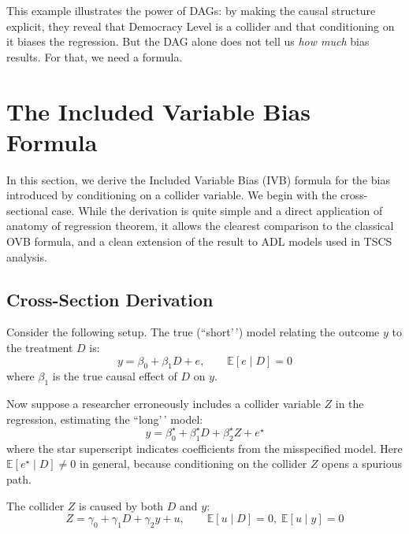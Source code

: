 \documentclass[
]{article}
\begin{document}
This example illustrates the power of DAGs: by making the causal
structure explicit, they reveal that Democracy Level is a collider and
that conditioning on it biases the regression. But the DAG alone does
not tell us \textit{how much} bias results. For that, we need a formula.

\section{\texorpdfstring{The Included Variable Bias Formula
\label{sec:ivb}}{The Included Variable Bias Formula }}\label{the-included-variable-bias-formula}

In this section, we derive the Included Variable Bias (IVB) formula for
the bias introduced by conditioning on a collider variable. We begin
with the cross-sectional case. While the derivation is quite simple and
a direct application of anatomy of regression theorem, it allows the
clearest comparison to the classical OVB formula, and a clean extension
of the result to ADL models used in TSCS analysis.

\subsection{\texorpdfstring{Cross-Section Derivation
\label{sec:cs_derivation}}{Cross-Section Derivation }}\label{cross-section-derivation}

Consider the following setup. The true (``short'\,') model relating the
outcome \(y\) to the treatment \(D\) is: \begin{equation}
y = \beta_0 + \beta_1 D + e, \qquad \mathbb{E}[e \mid D] = 0
\label{eq:short}
\end{equation} where \(\beta_1\) is the true causal effect of \(D\) on
\(y\).

Now suppose a researcher erroneously includes a collider variable \(Z\)
in the regression, estimating the ``long'\,' model: \begin{equation}
y = \beta_0^{\star} + \beta_1^{\star} D + \beta_2^{\star} Z + e^{\star}
\label{eq:long}
\end{equation} where the star superscript indicates coefficients from
the misspecified model. Here \(\mathbb{E}[e^{\star} \mid D] \neq 0\) in
general, because conditioning on the collider \(Z\) opens a spurious
path.

The collider \(Z\) is caused by both \(D\) and \(y\): \begin{equation}
Z = \gamma_0 + \gamma_1 D + \gamma_2 y + u, \qquad \mathbb{E}[u \mid D] = 0, \; \mathbb{E}[u \mid y] = 0
\label{eq:collider_structural}
\end{equation}
\end{document}
